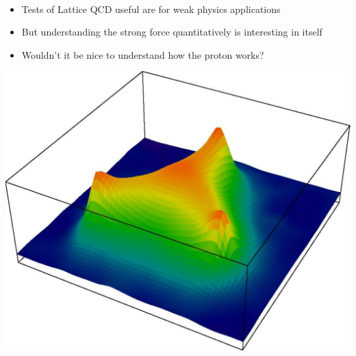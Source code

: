 \documentclass[landscape]{article}
\newenvironment{slide}[1][ ]{\mbox{\bf \boldmath #1 } \vfill}{\vfill \vspace{-1.5 cm} \mbox{ } \pagebreak}
\newenvironment{itemizer}[1]{\begin{itemize}\setlength{\itemsep}{#1}}{\end{itemize}}
\begin{document}
\begin{slide}

\begin{itemizer}{1 cm}

  \item Tests of Lattice QCD useful are for weak physics applications

  \item But understanding the strong force quantitatively is interesting in itself

  \item Wouldn't it be nice to understand how the proton works?

\end{itemizer}

\vfill

\begin{center}
  \includegraphics[width=0.6\linewidth]{../qcd_proton}
\end{center}

\end{slide}
\end{document}
